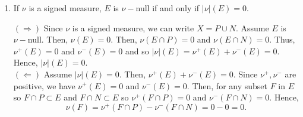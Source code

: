 \begin{enumerate}
\item If $\nu$ is a signed measure, $E$ is $\nu-$null if and only if $|\nu|(E)=0$.
\begin{pf}
$(\Rightarrow)$ Since $\nu$ is a signed measure, we can write $X= P \cup N$. Assume $E$ is $\nu-$null. Then, $\nu(E)=0$. Then, $\nu(E \cap P)=0$ and $\nu(E \cap N)=0$. Thus, $\nu^+(E)=0$ and $\nu^-(E)=0$ and so $|\nu|(E)= \nu^+(E)+\nu^-(E)=0$. Hence, $|\nu|(E)=0$.
\\
$(\Leftarrow)$ Assume $|\nu|(E)=0$. Then, $\nu^+(E) + \nu^-(E)=0$. Since $\nu^+, \nu^-$ are positive, we have $\nu^+(E)=0$ and $\nu^-(E)=0$. Then, for any subset $F$ in $E$ so $F \cap P \subset E$ and $F \cap N \subset E$ so $\nu^+(F \cap P)=0$ and $\nu^-(F \cap N)=0$. Hence,
\[
\nu(F)=\nu^+(F \cap P) - \nu^-(F \cap N) = 0 - 0 = 0.
\]

\end{pf}


\end{enumerate}
